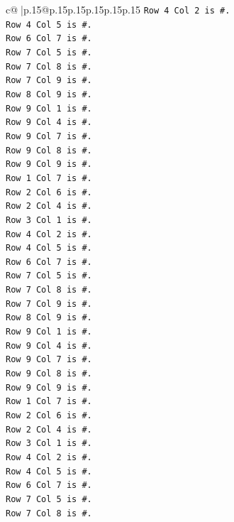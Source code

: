\documentclass{article}
\begin{document}
{\begin{supertabular}{c@{$\;$}|p{.15\linewidth}@{}p{.15\linewidth}p{.15\linewidth}p{.15\linewidth}p{.15\linewidth}p{.15\linewidth}}
{{{\texttt{Row 4 Col 2 is \#.} \\
\texttt{Row 4 Col 5 is \#.} \\
\texttt{Row 6 Col 7 is \#.} \\
\texttt{Row 7 Col 5 is \#.} \\
\texttt{Row 7 Col 8 is \#.} \\
\texttt{Row 7 Col 9 is \#.} \\
\texttt{Row 8 Col 9 is \#.} \\
\texttt{Row 9 Col 1 is \#.} \\
\texttt{Row 9 Col 4 is \#.} \\
\texttt{Row 9 Col 7 is \#.} \\
\texttt{Row 9 Col 8 is \#.} \\
\texttt{Row 9 Col 9 is \#.} \\
\texttt{Row 1 Col 7 is \#.} \\
\texttt{Row 2 Col 6 is \#.} \\
\texttt{Row 2 Col 4 is \#.} \\
\texttt{Row 3 Col 1 is \#.} \\
\texttt{Row 4 Col 2 is \#.} \\
\texttt{Row 4 Col 5 is \#.} \\
\texttt{Row 6 Col 7 is \#.} \\
\texttt{Row 7 Col 5 is \#.} \\
\texttt{Row 7 Col 8 is \#.} \\
\texttt{Row 7 Col 9 is \#.} \\
\texttt{Row 8 Col 9 is \#.} \\
\texttt{Row 9 Col 1 is \#.} \\
\texttt{Row 9 Col 4 is \#.} \\
\texttt{Row 9 Col 7 is \#.} \\
\texttt{Row 9 Col 8 is \#.} \\
\texttt{Row 9 Col 9 is \#.} \\
\texttt{Row 1 Col 7 is \#.} \\
\texttt{Row 2 Col 6 is \#.} \\
\texttt{Row 2 Col 4 is \#.} \\
\texttt{Row 3 Col 1 is \#.} \\
\texttt{Row 4 Col 2 is \#.} \\
\texttt{Row 4 Col 5 is \#.} \\
\texttt{Row 6 Col 7 is \#.} \\
\texttt{Row 7 Col 5 is \#.} \\
\texttt{Row 7 Col 8 is \#.} \\
}}}
\end{supertabular}}
\end{document}
